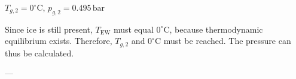 \( T_{g,2} = 0^\circ \text{C} \), \( p_{g,2} = 0.495 \, \text{bar} \)  

Since ice is still present, \( T_{\text{EW}} \) must equal \( 0^\circ \text{C} \), because thermodynamic equilibrium exists. Therefore, \( T_{g,2} \) and \( 0^\circ \text{C} \) must be reached. The pressure can thus be calculated.  

---